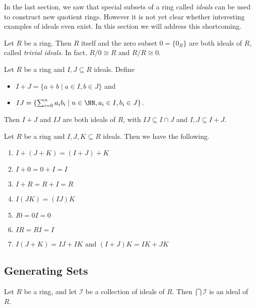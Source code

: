 \documentclass{article}
\begin{document}

In the last section, we saw that special subsets of a ring called \emph{ideals} can be used to construct new quotient rings. However it is not yet clear whether interesting examples of ideals even exist. In this section we will address this shortcoming.

\begin{prop}
Let $R$ be a ring. Then $R$ itself and the zero subset $0 = \{0_R\}$ are both ideals of $R$, called \emph{trivial ideals}. In fact, $R/0 \cong R$ and $R/R \cong 0$.
\end{prop}

\begin{prop}
Let $R$ be a ring and $I, J \subseteq R$ ideals. Define
\begin{itemize}
\item $I + J = \{ a+b \mid a \in I, b \in J \}$ and
\item $IJ = \{ \sum_{i=0}^n a_i b_i \mid n \in \NN, a_i \in I, b_i \in J \}$.
\end{itemize}
Then $I+J$ and $IJ$ are both ideals of $R$, with $IJ \subseteq I \cap J$ and $I,J \subseteq I+J$.
\end{prop}

\begin{prop}
Let $R$ be a ring and $I,J,K \subseteq R$ ideals. Then we have the following.
\begin{enumerate}
\item $I+(J+K) = (I+J)+K$
\item $I+0 = 0+I = I$
\item $I+R = R+I = R$
\item $I(JK) = (IJ)K$
\item $I0 = 0I = 0$
\item $IR = RI = I$
\item $I(J+K) = IJ+IK$ and $(I+J)K = IK+JK$
\end{enumerate}
\end{prop}

\subsection*{Generating Sets}

\begin{prop}
Let $R$ be a ring, and let $\mathcal{I}$ be a collection of ideals of $R$. Then $\bigcap \mathcal{I}$ is an ideal of $R$.
\end{prop}
\end{document}
